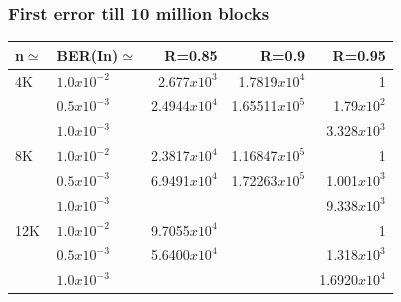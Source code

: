 \documentclass[xcolor=dvipsname]
{beamer}
\begin{document}
\begin{frame}[t] 
\frametitle{First error till 10 million blocks}

\begin{table}[]
\centering
\begin{tabular}{|l|l|r|r|r|}
\hline
n$\simeq$   & BER(In)$\simeq$  & R=0.85  & R=0.9 & R=0.95 \\ \hline
4K  & $1.0x10^{-2}$    &2.677$x10^{3}$           &1.7819$x10^{4}$       &1       \\ 
    & $0.5x10^{-3}$    &2.4944$x10^{4}$          &1.65511$x10^{5}$     &1.79$x10^{2}$   \\ 
    & $1.0x10^{-3}$    &        				 &                		&3.328$x10^{3}$ \\ \hline
8K  & $1.0x10^{-2}$    &2.3817$x10^{4}$          &1.16847$x10^{5}$        &1   \\ 
    & $0.5x10^{-3}$    &6.9491$x10^{4}$          &1.72263$x10^{5}$        &1.001$x10^{3}$  \\ 
    & $1.0x10^{-3}$    &                		 &                		&9.338$x10^{3}$           \\ \hline
12K & $1.0x10^{-2}$    &9.7055$x10^{4}$          &       		 		&1       \\
    & $0.5x10^{-3}$    &5.6400$x10^{4}$          &     			 		&1.318$x10^{3}$             \\ 
    & $1.0x10^{-3}$    & 			             &    					 &1.6920$x10^{4}$   \\ \hline 
\end{tabular}
\end{table}

\end{frame}
\end{document}
